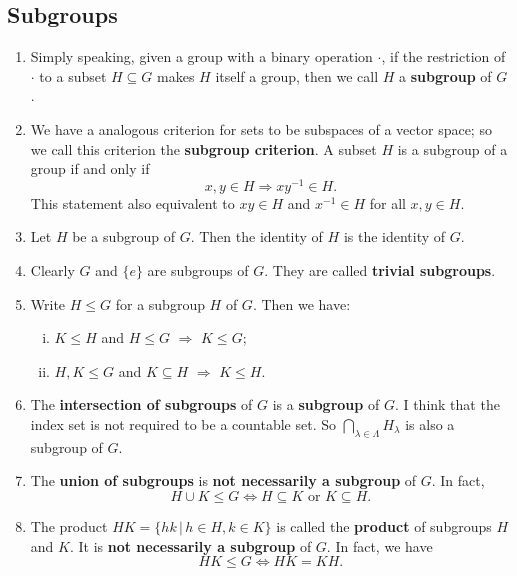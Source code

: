 \subsection*{Subgroups}
\begin{enumerate}[(1)]
	\item Simply speaking, given a group with a binary operation $\cdot$, if the restriction of $\cdot$ to a subset $H\subseteq G$ makes $H$ itself a group, then we call $H$ a \textbf{subgroup} of $G$.
	\item We have a analogous criterion for sets to be subspaces of a vector space; so we call this criterion the \textbf{subgroup criterion}. A subset $H$ is a subgroup of  a group if and only if  $$x,y\in H\Rightarrow xy^{-1}\in H.$$ This statement also equivalent to $xy\in H$ and $x^{-1}\in H$ for all $x,y\in H$.
	\item Let $H$ be a subgroup of $G$. Then the identity of $H$ is the identity of $G$.
	\item Clearly $G$ and $\{e\}$ are subgroups of $G$. They are called \textbf{trivial subgroups}. 
	\item Write $H\leq G$ for a subgroup $H$ of $G$. Then we have:
	\begin{enumerate}[(i)]
		\item $K\leq H$ and $H\leq G$ $\Rightarrow$ $K\leq G$;
		\item $H,K\leq G$ and $K\subseteq H$ $\Rightarrow$ $K\leq H$.
	\end{enumerate}
	\item The \textbf{intersection of subgroups} of $G$ is a \textbf{subgroup} of $G$. I think that the index set is not required to be a countable set. So $\bigcap_{\lambda\in\Lambda} H_\lambda$ is also a subgroup of $G$.
	\item The \textbf{union of subgroups} is \textbf{not necessarily a subgroup} of $G$. In fact, 
	\begin{equation*}
		H\cup K\leq G\Leftrightarrow H\subseteq K\text{ or }K\subseteq H.
	\end{equation*}
	\item The product $HK = \{hk\,|\, h\in H,k\in K\}$ is called the \textbf{product} of subgroups $H$ and $K$. It is \textbf{not necessarily a subgroup} of $G$. In fact, we have
	\begin{equation*}
		HK\leq G\Leftrightarrow HK = KH.
	\end{equation*}
\end{enumerate}

